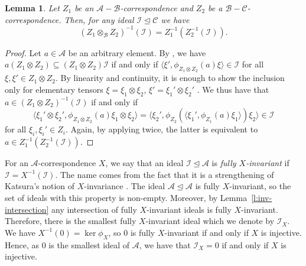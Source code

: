 \documentclass[11pt, letterpaper,final]{amsart}
\newcommand{\A}{{\mathcal{A}}}
\newcommand{\B}{{\mathcal{B}}}
\newcommand{\I}{{\mathcal{I}}}
\newtheorem{lem}[thm]{Lemma}
\theoremstyle{definition}
\begin{document}
\begin{lem}\label{l:inv-composition}
  Let $Z_1$ be an $\A-\B$-correspondence and $Z_2$ be a $\B-\mathcal{C}$-correspondence.
  Then, for any ideal $\I\unlhd \mathcal{C}$ we have
  \[
    (Z_1\otimes_{\B} Z_2)^{-1}(\I) = Z_1^{-1}(Z_2^{-1}(\I)).
  \]
\end{lem}
\begin{proof}
  Let $a\in \A$ be an arbitrary element.
  By \cite[Proposition 1.3]{KatII}, we have $a(Z_1 \otimes Z_2)\subseteq (Z_1\otimes Z_2)\I$ if and only if $\langle \xi', \phi_{Z_1\otimes Z_2}(a) \xi\rangle \in \I$ for all $\xi, \xi'\in Z_1\otimes Z_2$.
  By linearity and continuity, it is enough to show the inclusion only for elementary tensors $\xi = \xi_1\otimes \xi_2$, $\xi'=\xi_1'\otimes \xi_2'$ .
  We thus have that $a\in (Z_1\otimes Z_2)^{-1}(\I)$ if and only if
  \[
    \langle \xi_1'\otimes \xi_2', \phi_{Z_1\otimes Z_2}(a)\xi_1\otimes \xi_2\rangle = \langle \xi_2', \phi_{Z_2}\left(\langle \xi_1', \phi_{Z_1}(a)\xi_1\rangle\right) \xi_2\rangle \in \I
  \]
  for all $\xi_i,\xi_i'\in Z_i$.
  Again, by applying \cite[Proposition 1.3]{KatII} twice, the latter is equivalent to $a\in Z_1^{-1}(Z_2^{-1}(\I))$.
 \end{proof} 

 For an $\A$-correspondence $X$, we say that an ideal $\I\unlhd \A$ is \emph{fully $X$-invariant} if $\I = X^{-1}(\I)$.
The name comes from the fact that it is a strengthening of Katsura's notion of $X$-invariance \cite[Definition 4.8]{KatII}.
The ideal $\A\unlhd \A$ is fully $X$-invariant, so the set of ideals with this property is non-empty.
Moreover, by Lemma~\ref{l:inv-intersection} any intersection of fully $X$-invariant ideals is fully $X$-invariant.
Therefore, there is the smallest fully $X$-invariant ideal which we denote by $\I_X$.
We have $X^{-1}(0) = \ker \phi_X$, so $0$ is fully $X$-invariant if and only if $X$ is injective.
Hence, as $0$ is the smallest ideal of $\A$, we have that $\I_X = 0$ if and only if $X$ is injective.
\end{document}
